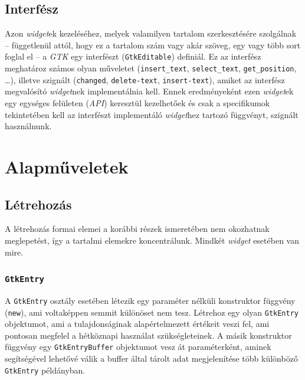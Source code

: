 \subsection{Interfész}

Azon \textit{widget}ek kezeléséhez, melyek valamilyen tartalom szerkesztésére szolgálnak -- függetlenül attól, hogy ez a tartalom szám vagy akár szöveg, egy vagy több sort foglal el -- a \textit{GTK} egy interfészt (\texttt{GtkEditable}) definiál. Ez az interfész meghatároz számos olyan műveletet (\texttt{insert\_text}, \texttt{select\_text}, \texttt{get\_position}, \dots), illetve szignált (\texttt{changed}, \texttt{delete-text}, \texttt{insert-text}), amiket az interfész megvalósító \textit{widget}nek implementálnia kell. Ennek eredményeként ezen \textit{widget}ek egy egységes felületen (\textit{API}) keresztül kezelhetőek és csak a specifikumok tekintetében kell az interfészt implementáló \textit{widget}hez tartozó függvényt, szignált használnunk.

\section{Alapműveletek}

\subsection{Létrehozás}

A létrehozás formai elemei a korábbi részek ismeretében nem okozhatnak meglepetést, így a tartalmi elemekre koncentrálunk. Mindkét \textit{widget} esetében van mire.

\subsubsection{\texttt{GtkEntry}}

A \texttt{GtkEntry} osztály esetében létezik egy paraméter nélküli konstruktor függvény (\texttt{new}), ami voltaképpen semmit különöset nem tesz. Létrehoz egy olyan \texttt{GtkEntry} objektumot, ami a tulajdonságinak alapértelmezett értékeit veszi fel, ami pontosan megfelel a hétköznapi használat szükségleteinek. A másik konstruktor függvény egy \texttt{GtkEntryBuffer} objektumot vesz át paraméterként, aminek segítségével lehetővé válik a buffer által tárolt adat megjelenítése több különböző \texttt{GtkEntry} példányban.

